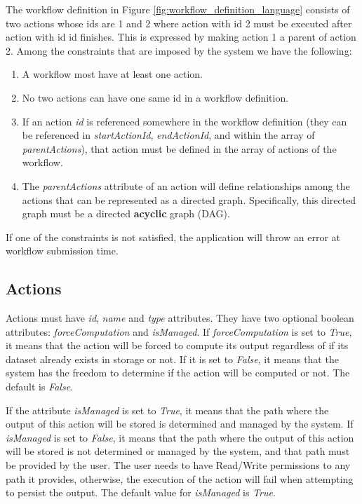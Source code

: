 The workflow definition in Figure \ref{fig:workflow_definition_language} consists of two actions whose ids are 1 and 2 where action with id 2 must be executed after action with id id finishes. This is expressed by making action 1 a parent of action 2. Among the constraints that are imposed by the system we have the following:

\begin{enumerate}
\item A workflow most have at least one action.
\item No two actions can have one same id in a workflow definition.
\item If an action \textit{id} is referenced somewhere in the workflow definition (they can be referenced in \textit{startActionId}, \textit{endActionId}, and within the array of \textit{parentActions}), that action must be defined in the array of actions of the workflow.
\item The \textit{parentActions} attribute of an action will define relationships among the actions that can be represented as a directed graph. Specifically, this directed graph must be a directed \textbf{acyclic} graph (DAG).
\end{enumerate}

If one of the constraints is not satisfied, the application will throw an error at workflow submission time.

\subsection{Actions}
Actions must have \textit{id}, \textit{name} and \textit{type} attributes. They have two optional boolean attributes: \textit{forceComputation} and \textit{isManaged}. If \textit{forceComputation} is set to \textit{True}, it means that the action will be forced to compute its output regardless of if its dataset  already exists in storage or not. If it is set to \textit{False}, it means that the system has the freedom to determine if the action will be computed or not. The default is \textit{False}.

If the attribute \textit{isManaged} is set to \textit{True}, it means that the path where the output of this action will be stored is determined and managed by the system. If \textit{isManaged} is set to \textit{False}, it means that the path where the output of this action will be stored is not determined or managed by the system, and that path must be provided by the user. The user needs to have Read/Write permissions to any path it provides, otherwise, the execution of the action will fail when attempting to persist the output. The default value for \textit{isManaged} is \textit{True}.

